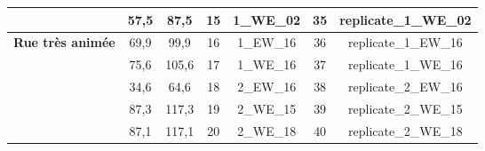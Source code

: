 \begin{table}[ht]
\begin{tabular}{|p{2cm}|c|c||c|c||c|c|}
                                  & 57,5 & 87,5 & 15 & 1\_WE\_02 & 35 & replicate\_1\_WE\_02     \\
\hline
\multirow{5}{2cm}{\textbf{Rue très  animée}} & 69,9 & 99,9 & 16 & 1\_EW\_16 & 36 & replicate\_1\_EW\_16 \\
                                  & 75,6 & 105,6 & 17 & 1\_WE\_16 & 37 & replicate\_1\_WE\_16 \\
                                  & 34,6 & 64,6 & 18 & 2\_EW\_16 & 38 & replicate\_2\_EW\_16 \\
                                  & 87,3 & 117,3 & 19 & 2\_WE\_15 & 39 & replicate\_2\_WE\_15 \\
                                  & 87,1 & 117,1 & 20 & 2\_WE\_18 & 40 & replicate\_2\_WE\_18\\
\bottomrule
\end{tabular}
\label{tab:resume_scene_test}
\end{table}
